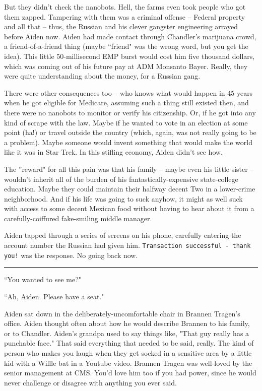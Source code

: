 \documentclass[11pt]{book}
\begin{document}
	But they didn't check the nanobots. Hell, the farms even took people who got them zapped. Tampering with them was a criminal offense -- Federal property and all that -- thus, the Russian and his clever gangster engineering arrayed before Aiden now. Aiden had made contact through Chandler's marijuana crowd, a friend-of-a-friend thing (maybe ``friend" was the wrong word, but you get the idea). This little 50-millisecond EMP burst would cost him five thousand dollars, which was coming out of his future pay at ADM Monsanto Bayer. Really, they were quite understanding about the money, for a Russian gang. 
	
	There were other consequences too -- who knows what would happen in 45 years when he got eligible for Medicare, assuming such a thing still existed then, and there were no nanobots to monitor or verify his citizenship. Or, if he got into any kind of scrape with the law. Maybe if he wanted to vote in an election at some point (ha!) or travel outside the country (which, again, was not really going to be a problem). Maybe someone would invent something that would make the world like it was in Star Trek. In this stifling economy, Aiden didn't see how. 
	
	The ''reward" for all this pain was that his family -- maybe even his little sister -- wouldn't inherit all of the burden of his fantastically-expensive state-college education. Maybe they could maintain their halfway decent Two in a lower-crime neighborhood. And if his life was going to suck anyhow, it might as well suck with access to some decent Mexican food without having to hear about it from a carefully-coiffured fake-smiling middle manager.
	
	Aiden tapped through a series of screens on his phone, carefully entering the account number the Russian had given him. \texttt{Transaction successful - thank you!} was the response. No going back now.
	
	\vspace{0.5cm}
	\hrule
	\vspace{0.5cm}
	
	``You wanted to see me?"
	
	``Ah, Aiden. Please have a seat."
	
	Aiden sat down in the deliberately-uncomfortable chair in Brannen Tragen's office. Aiden thought often about how he would describe Brannen to his family, or to Chandler. Aiden's grandpa used to say things like, "That guy really has a punchable face." That said everything that needed to be said, really. The kind of person who makes you laugh when they get socked in a sensitive area by a little kid with a Wiffle bat in a Youtube video. Brannen Tragen was well-loved by the senior management at CMS. You'd love him too if you had power, since he would never challenge or disagree with anything you ever said.
	
\end{document}
